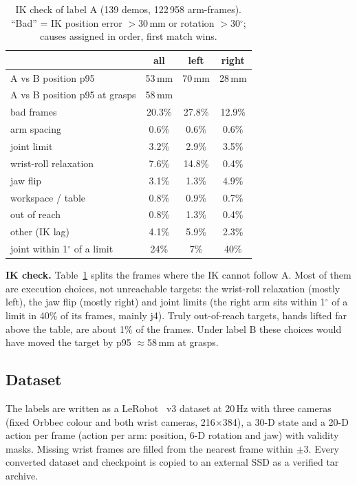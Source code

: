 \documentclass[conference,10pt]{IEEEtran}
\newcommand{\mm}{\,mm\xspace}
\begin{document}
\begin{table}[t]
\caption{IK check of label A (139 demos, 122\,958 arm-frames). ``Bad'' = IK position error $>$30\mm or rotation $>$30$^\circ$;
causes assigned in order, first match wins.}\label{tab:ikqa}
\centering\small
\begin{tabular}{@{}lccc@{}}
\toprule
 & all & left & right \\
\midrule
A vs B position p95 & 53\mm & 70\mm & 28\mm \\
A vs B position p95 at grasps & 58\mm & & \\
bad frames & 20.3\% & 27.8\% & 12.9\% \\
\quad arm spacing & 0.6\% & 0.6\% & 0.6\% \\
\quad joint limit & 3.2\% & 2.9\% & 3.5\% \\
\quad wrist-roll relaxation & 7.6\% & 14.8\% & 0.4\% \\
\quad jaw flip & 3.1\% & 1.3\% & 4.9\% \\
\quad workspace / table & 0.8\% & 0.9\% & 0.7\% \\
\quad out of reach & 0.8\% & 1.3\% & 0.4\% \\
\quad other (IK lag) & 4.1\% & 5.9\% & 2.3\% \\
joint within 1$^\circ$ of a limit & 24\% & 7\% & 40\% \\
\bottomrule
\end{tabular}
\end{table}
\textbf{IK check.} Table~\ref{tab:ikqa} splits the frames where the IK cannot follow A. Most of them are execution
choices, not unreachable targets: the wrist-roll relaxation (mostly left), the jaw flip (mostly right) and joint limits
(the right arm sits within 1$^\circ$ of a limit in 40\% of its frames, mainly j4). Truly out-of-reach targets, hands lifted
far above the table, are about 1\% of the frames. Under label B these choices would have moved the target by p95
$\approx$58\mm at grasps.

\subsection{Dataset}\label{sec:traindata}
The labels are written as a LeRobot~\cite{cadene2024lerobot} v3 dataset at 20\,Hz with three cameras (fixed Orbbec colour
and both wrist cameras, 216$\times$384), a 30-D state and a 20-D action per frame (action per arm: position, 6-D rotation and jaw) with validity masks. Missing wrist frames are filled from the nearest frame within $\pm$3.
Every converted dataset and checkpoint is copied to an external SSD as a verified tar archive.
\end{document}
